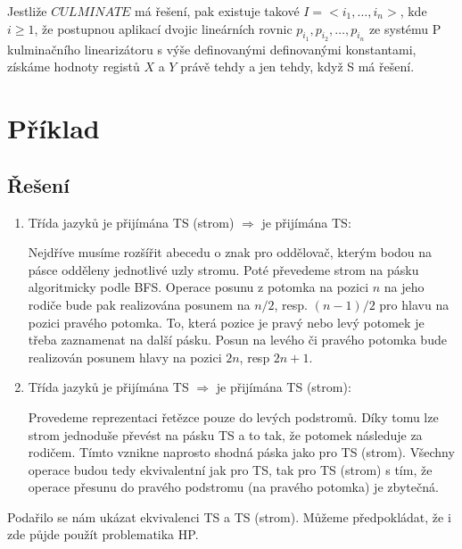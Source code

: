 \documentclass[11pt, a4paper]{article}
\begin{document}
\noindent Jestliže $CULMINATE$ má řešení, pak existuje takové $I = <i_1, \dots, i_n>$, kde $i \geq 1$, že postupnou aplikací dvojic lineárních rovnic $p_{i_1}, p_{i_2}, \dots, p_{i_n}$ ze systému P kulminačního linearizátoru s výše definovanými definovanými konstantami, získáme hodnoty registů $X$ a $Y$ právě tehdy a jen tehdy, když S má řešení.

\clearpage
\maketitle
\section{Příklad}
\subsection*{Řešení}

\begin{enumerate}
	\item Třída jazyků je přijímána TS (strom) $\Rightarrow$ je přijímána TS:

	      Nejdříve musíme rozšířit abecedu o znak pro oddělovač, kterým bodou na pásce odděleny jednotlivé uzly stromu. Poté převedeme strom na pásku algoritmicky podle BFS. Operace posunu z potomka na pozici $n$ na jeho rodiče bude pak realizována posunem na $n/2$, resp. $(n-1)/2$ pro hlavu na pozici pravého potomka. To, která pozice je pravý nebo levý potomek je třeba zaznamenat na další pásku. Posun na levého či pravého potomka bude realizován posunem hlavy na pozici $2n$, resp $2n + 1$.

	\item Třída jazyků je přijímána TS $\Rightarrow$ je přijímána TS (strom):

	      Provedeme reprezentaci řetězce pouze do levých podstromů. Díky tomu lze strom jednoduše převést na pásku TS a to tak, že potomek následuje za rodičem. Tímto vznikne naprosto shodná páska jako pro TS (strom). Všechny operace budou tedy ekvivalentní jak pro TS, tak pro TS (strom) s tím, že operace přesunu do pravého podstromu (na pravého potomka) je zbytečná.
\end{enumerate}

Podařilo se nám ukázat ekvivalenci TS a TS (strom). Můžeme předpokládat, že i zde půjde použít problematika HP.
\end{document}
